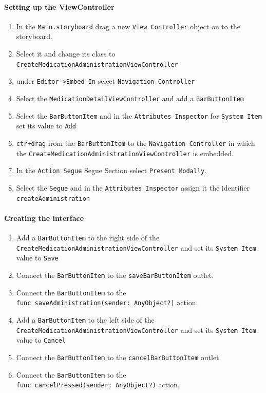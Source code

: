 \documentclass{article}
\begin{document}
\paragraph{Setting up the ViewController}\label{setting-up-the-viewcontroller}

\begin{enumerate}
\def\labelenumi{\arabic{enumi}.}
\item
  In the \texttt{Main.storyboard} drag a new \texttt{View\ Controller}
  object on to the storyboard.
\item
  Select it and change its class to
  \texttt{CreateMedicationAdministrationViewController}
\item
  under \texttt{Editor-\textgreater{}Embed\ In} select
  \texttt{Navigation\ Controller}
\item
  Select the \texttt{MedicationDetailViewController} and add a
  \texttt{BarButtonItem}
\item
  Select the \texttt{BarButtonItem} and in the
  \texttt{Attributes\ Inspector} for \texttt{System\ Item} set its value
  to \texttt{Add}
\item
  \texttt{ctr+drag} from the \texttt{BarButtonItem} to the
  \texttt{Navigation\ Controller} in which the
  \texttt{CreateMedicationAdministrationViewController} is embedded.
\item
  In the \texttt{Action\ Segue} Segue Section select
  \texttt{Present\ Modally}.
\item
  Select the \texttt{Segue} and in the \texttt{Attributes\ Inspector}
  assign it the identifier \texttt{createAdministration}
\end{enumerate}

\paragraph{Creating the interface}\label{creating-the-interface}

\begin{enumerate}
\def\labelenumi{\arabic{enumi}.}

\item
  Add a \texttt{BarButtonItem} to the right side of the
  \texttt{CreateMedicationAdministrationViewController} and set its
  \texttt{System\ Item} value to \texttt{Save}
\item
  Connect the \texttt{BarButtonItem} to the \texttt{saveBarButtonItem}
  outlet.
\item
  Connect the \texttt{BarButtonItem} to the
  \texttt{func\ saveAdministration(sender:\ AnyObject?)} action.
\item
  Add a \texttt{BarButtonItem} to the left side of the
  \texttt{CreateMedicationAdministrationViewController} and set its
  \texttt{System\ Item} value to \texttt{Cancel}
\item
  Connect the \texttt{BarButtonItem} to the \texttt{cancelBarButtonItem}
  outlet.
\item
  Connect the \texttt{BarButtonItem} to the
  \texttt{func\ cancelPressed(sender:\ AnyObject?)} action.
\end{enumerate}
\end{document}
